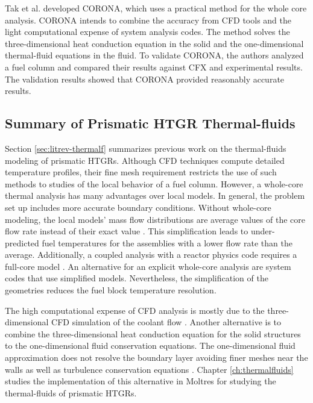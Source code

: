 Tak et al. \cite{tak_practical_2012} \cite{tak_development_2014} developed CORONA, which uses a practical method for the whole core analysis.
CORONA intends to combine the accuracy from CFD tools and the light computational expense of system analysis codes.
The method solves the three-dimensional heat conduction equation in the solid and the one-dimensional thermal-fluid equations in the fluid.
To validate CORONA, the authors analyzed a fuel column and compared their results against CFX and experimental results.
The validation results showed that CORONA provided reasonably accurate results.

\subsection{Summary of Prismatic HTGR Thermal-fluids}

Section \ref{sec:litrev-thermalf} summarizes previous work on the thermal-fluids modeling of prismatic HTGRs.
Although CFD techniques compute detailed temperature profiles, their fine mesh requirement restricts the use of such methods to studies of the local behavior of a fuel column.
However, a whole-core thermal analysis has many advantages over local models.
In general, the problem set up includes more accurate boundary conditions.
Without whole-core modeling, the local models' mass flow distributions are average values of the core flow rate instead of their exact value \cite{huning_novel_2016}.
This simplification leads to under-predicted fuel temperatures for the assemblies with a lower flow rate than the average.
Additionally, a coupled analysis with a reactor physics code requires a full-core model \cite{tak_practical_2012}.
An alternative for an explicit whole-core analysis are system codes that use simplified models.
Nevertheless, the simplification of the geometries reduces the fuel block temperature resolution.


The high computational expense of CFD analysis is mostly due to the three-dimensional CFD simulation of the coolant flow \cite{travis_thermalhydraulics_2013}.
Another alternative is to combine the three-dimensional heat conduction equation for the solid structures to the one-dimensional fluid conservation equations.
The one-dimensional fluid approximation does not resolve the boundary layer avoiding finer meshes near the walls as well as turbulence conservation equations \cite{tak_development_2014}.
Chapter \ref{ch:thermalfluids} studies the implementation of this alternative in Moltres for studying the thermal-fluids of prismatic HTGRs.

